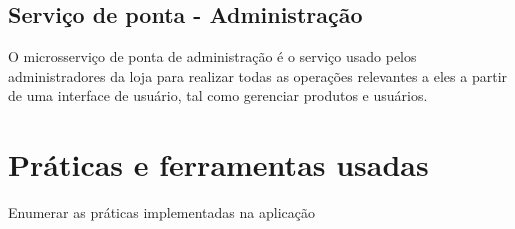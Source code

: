 \subsection{Serviço de ponta - Administração}
O microsserviço de ponta de administração é o serviço usado pelos administradores da loja para realizar todas as operações relevantes a eles a partir de uma interface de usuário, tal como gerenciar produtos e usuários.

\section{Práticas e ferramentas usadas}
Enumerar as práticas implementadas na aplicação